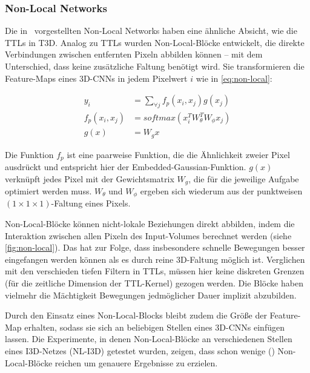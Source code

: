 \subsubsection*{Non-Local Networks}

Die in~\cite{Wang18} vorgestellten Non-Local Networks haben eine ähnliche Absicht, wie die TTLs in T3D.
Analog zu TTLs wurden Non-Local-Blöcke entwickelt, die direkte Verbindungen zwischen entfernten Pixeln abbilden können -- mit dem Unterschied, dass keine zusätzliche Faltung benötigt wird.
Sie transformieren die Feature-Maps eines 3D-CNNs in jedem Pixelwert $i$ wie in \autoref{eq:non-local}:

\begin{equation}
\label{eq:non-local}
\begin{split}
    y_i             & = \sum_{\forall j} f_p(x_i, x_j) g(x_j) \\
    f_p(x_i, x_j)   & = softmax(x_i^T W^T_\theta W_\phi x_j) \\
    g(x)            & = W_g x
\end{split}
\end{equation}

Die Funktion $f_p$ ist eine paarweise Funktion, die die Ähnlichkeit zweier Pixel ausdrückt und entspricht hier der Embedded-Gaussian-Funktion.
$g(x)$ verknüpft jedes Pixel mit der Gewichtsmatrix $W_g$, die für die jeweilige Aufgabe optimiert werden muss.
$W_\theta$ und $W_\phi$ ergeben sich wiederum aus der punktweisen $(1 \times 1 \times 1)$-Faltung eines Pixels.

Non-Local-Blöcke können nicht-lokale Beziehungen direkt abbilden, indem die Interaktion zwischen allen Pixeln des Input-Volumes berechnet werden (siehe \autoref{fig:non-local}).
Das hat zur Folge, dass insbesondere schnelle Bewegungen besser eingefangen werden können als es durch reine 3D-Faltung möglich ist.
Verglichen mit den verschieden tiefen Filtern in TTLs, müssen hier keine diskreten Grenzen (für die zeitliche Dimension der TTL-Kernel) gezogen werden.
Die Blöcke haben vielmehr die Mächtigkeit Bewegungen jedmöglicher Dauer implizit abzubilden.

Durch den Einsatz eines Non-Local-Blocks bleibt zudem die Größe der Feature-Map erhalten, sodass sie sich an beliebigen Stellen eines 3D-CNNs einfügen lassen.
Die Experimente, in denen Non-Local-Blöcke an verschiedenen Stellen eines I3D-Netzes (NL-I3D) getestet wurden, zeigen, dass schon wenige () Non-Local-Blöcke reichen um genauere Ergebnisse zu erzielen.


